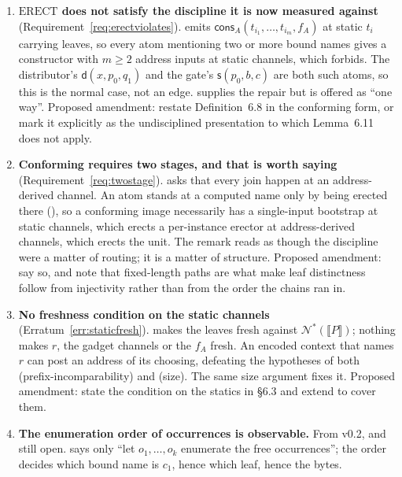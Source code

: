 \documentclass[11pt,a4paper]{article}
\newcommand{\enc}[1]{\llbracket #1 \rrbracket}
\newcommand{\nms}[1]{\mathcal{N}^{*}(#1)}
\newcommand{\dd}{\mathsf{d}}
\newcommand{\sy}{\mathsf{s}}
\newcommand{\cons}{\mathsf{cons}}
\newcommand{\ERECT}{\mathrm{ERECT}}
\theoremstyle{definition}
\theoremstyle{plain}
\begin{document}
\begin{enumerate}[leftmargin=1.8em]

\item \textbf{$\ERECT$ does not satisfy the discipline it is now measured
against} (Requirement~\ref{req:erectviolates}). \cite[Def.~6.8]{draft3} emits
$\cons_{A}(t_{i_{1}},\dots,t_{i_{m}},f_{A})$ at static $t_{i}$ carrying
leaves, so every atom mentioning two or more bound names gives a constructor
with $m \geq 2$ address inputs at static channels, which
\cite[Def.~6.10]{draft3} forbids. The distributor's $\dd(x,p_{0},q_{1})$ and
the gate's $\sy(p_{0},b,c)$ are both such atoms, so this is the normal case,
not an edge. \cite[Rem.~6.12]{draft3} supplies the repair but is offered as
``one way''. Proposed amendment: restate Definition~6.8 in the conforming
form, or mark it explicitly as the undisciplined presentation to which
Lemma~6.11 does not apply.

\item \textbf{Conforming requires two stages, and that is worth saying}
(Requirement~\ref{req:twostage}). \cite[Rem.~6.12]{draft3} asks that every
join happen at an address-derived channel. An atom stands at a computed name
only by being erected there (\cite[Rem.~3.11]{draft3}), so a conforming image
necessarily has a single-input bootstrap at static channels, which erects a
per-instance erector at address-derived channels, which erects the unit. The
remark reads as though the discipline were a matter of routing; it is a matter
of structure. Proposed amendment: say so, and note that fixed-length paths are
what make leaf distinctness follow from injectivity rather than from the order
the chains ran in.

\item \textbf{No freshness condition on the static channels}
(Erratum~\ref{err:staticfresh}). \cite[Lem.~6.14]{draft3} makes the leaves
fresh against $\nms{\enc{P}}$; nothing makes $r$, the gadget channels or the
$f_{A}$ fresh. An encoded context that names $r$ can post an address of its
choosing, defeating the hypotheses of both
\cite[Lem.~6.11]{draft3} (prefix-incomparability) and
\cite[Lem.~6.14]{draft3} (size). The same size argument fixes it. Proposed
amendment: state the condition on the statics in \S6.3 and extend
\cite[Lem.~7.6]{draft3} to cover them.

\item \textbf{The enumeration order of occurrences is observable.} From v0.2,
and still open. \cite[Def.~6.3]{draft3} says only ``let $o_{1},\dots,o_{k}$
enumerate the free occurrences''; the order decides which bound name is
$c_{1}$, hence which leaf, hence the bytes.


\end{enumerate}
\end{document}
